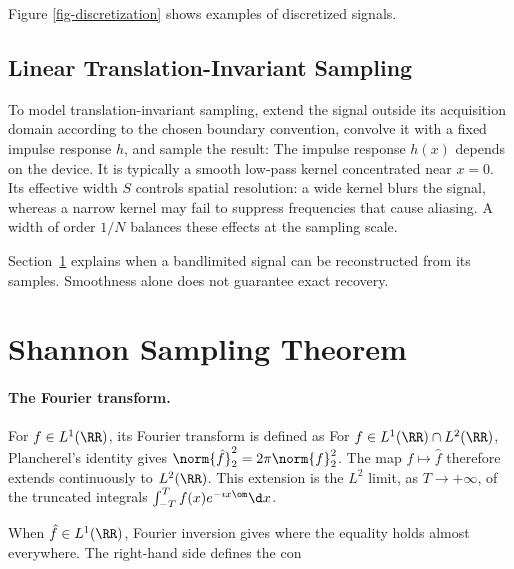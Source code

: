 
Figure \ref{fig-discretization} shows examples of discretized signals.

                                           
\subsection{Linear Translation-Invariant Sampling}

To model translation-invariant sampling, extend the signal outside its acquisition domain according to the chosen boundary convention, convolve it with a fixed impulse response $h$, and sample the result:
The impulse response $h(x)$ depends on the device. It is typically a smooth low-pass kernel concentrated near $x=0$. Its effective width $S$ controls spatial resolution: a wide kernel blurs the signal, whereas a narrow kernel may fail to suppress frequencies that cause aliasing. A width of order $1/N$ balances these effects at the sampling scale.

Section~\ref{subsec-sampling} explains when a bandlimited signal can be reconstructed from its samples. Smoothness alone does not guarantee exact recovery.


                                                                    
                                                                    
                                                                    
\section{Shannon Sampling Theorem}
\label{subsec-sampling}

   
\paragraph{The Fourier transform.}

For $f \in L^1(\RR)$, its Fourier transform is defined as
For $f\in L^1(\RR)\cap L^2(\RR)$, Plancherel's identity gives $\norm{\hat f}_2^2 = 2\pi\norm{f}_2^2$. The map $f \mapsto \hat f$ therefore extends continuously to $L^2(\RR)$. This extension is the $L^2$ limit, as $T \rightarrow +\infty$, of the truncated integrals $\int_{-T}^T f(x) e^{-\imath x \om} \d x$.
 
When $\hat f \in L^1(\RR)$, Fourier inversion gives
where the equality holds almost everywhere. The right-hand side defines the con